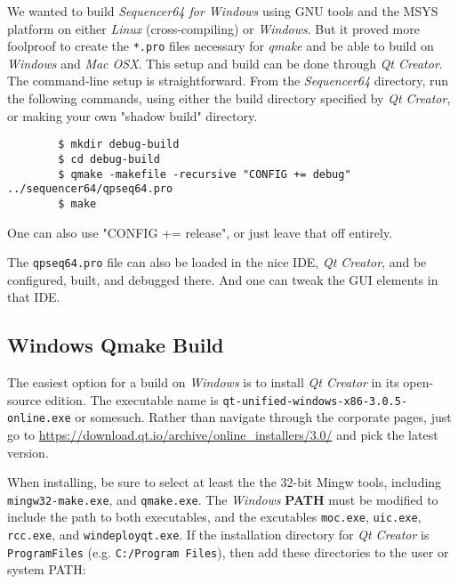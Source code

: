    We wanted to build \textsl{Sequencer64 for Windows} using GNU tools and the
   MSYS platform on either \textsl{Linux} (cross-compiling) or
   \textsl{Windows}.  But it proved more foolproof to create the
   \texttt{*.pro} files necessary for \textsl{qmake} and be able to build
   on \textsl{Windows} and \textsl{Mac OSX}.
   This setup and build can be done through \textsl{Qt Creator}.
   The command-line setup is straightforward.
   From the \textsl{Sequencer64} directory, run the following
   commands, using either the build directory specified by \textsl{Qt Creator},
   or making your own "shadow build" directory.

   \begin{verbatim}
        $ mkdir debug-build
        $ cd debug-build
        $ qmake -makefile -recursive "CONFIG += debug" ../sequencer64/qpseq64.pro
        $ make
   \end{verbatim}

    One can also use "CONFIG += release", or just leave that off entirely.

    The \texttt{qpseq64.pro} file can also be loaded in the
    nice IDE, \textsl{Qt Creator}, and be configured, built, and debugged
    there.  And one can tweak the GUI elements in that IDE.

\subsection{Windows Qmake Build}
\label{subsec:seq64_build_qmake_windows}

   The easiest option for a build on \textsl{Windows} is to install 
   \textsl{Qt Creator} in its open-source edition.
   The executable name is
   \texttt{qt-unified-windows-x86-3.0.5-online.exe} or somesuch.
   Rather than navigate through the corporate pages, just go to
   \url{https://download.qt.io/archive/online_installers/3.0/} and
   pick the latest version.
   
   When installing, be sure to select at least the the 32-bit Mingw tools,
   including \texttt{mingw32-make.exe}, and
   \texttt{qmake.exe}.  The \textsl{Windows}
   \textbf{PATH} must be modified to
   include the path to both executables, and the excutables
   \texttt{moc.exe}, \texttt{uic.exe}, \texttt{rcc.exe}, and
   \texttt{windeployqt.exe}.
   If the installation directory for \textsl{Qt Creator} is
   \texttt{ProgramFiles} (e.g. \texttt{C:/Program Files}), then add
   these directories to the user or system PATH:

